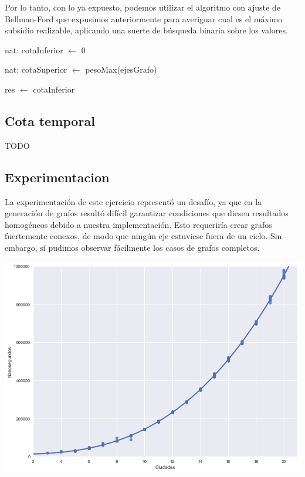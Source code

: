 Por lo tanto, con lo ya expuesto, podemos utilizar el algoritmo con ajuste de Bellman-Ford que expusimos anteriormente para averiguar cual es el máximo subsidio realizable, aplicando una suerte de búsqueda binaria sobre los valores.

\begin{algorithm}[H]
	\NoCaptionOfAlgo
	\caption{}		
		nat: cotaInferior $\leftarrow$ 0
		
		nat: cotaSuperior $\leftarrow$ pesoMax(ejesGrafo)
		
 		res $\leftarrow$ cotaInferior
\end{algorithm}

\subsection{Cota temporal}
TODO

\subsection{Experimentacion}

La experimentación de este ejercicio representó un desafío, ya que en la generación de grafos resultó difícil garantizar condiciones que diesen resultados homogéneos debido a nuestra implementación. Esto requeriría crear grafos fuertemente conexos, de modo que ningún eje estuviese fuera de un ciclo. Sin embargo, sí pudimos observar fácilmente los casos de grafos completos.

\begin{center}
	\includegraphics[scale=0.5]{imagenes/ej2-1.png}
\end{center}

